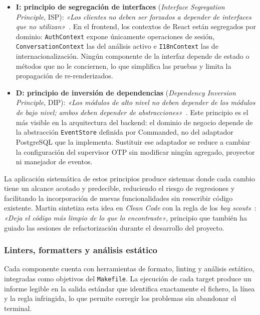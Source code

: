 \begin{itemize}
 \item \textbf{I: principio de segregación de interfaces} (\emph{Interface Segregation Principle}, ISP): \emph{«Los clientes no deben ser forzados a depender de interfaces que no utilizan»}~\cite{MartinPPP02}. En el frontend, los contextos de React están segregados por dominio: \texttt{AuthContext} expone únicamente operaciones de sesión, \texttt{ConversationContext} las del análisis activo e \texttt{I18nContext} las de internacionalización. Ningún componente de la interfaz depende de estado o métodos que no le conciernen, lo que simplifica las pruebas y limita la propagación de re-renderizados.

 \item \textbf{D: principio de inversión de dependencias} (\emph{Dependency Inversion Principle}, DIP): \emph{«Los módulos de alto nivel no deben depender de los módulos de bajo nivel; ambos deben depender de abstracciones»}~\cite{MartinPPP02}. Este principio es el más visible en la arquitectura del backend: el dominio de negocio depende de la abstracción \texttt{EventStore} definida por Commanded, no del adaptador PostgreSQL que la implementa. Sustituir ese adaptador se reduce a cambiar la configuración del supervisor OTP sin modificar ningún agregado, proyector ni manejador de eventos.
\end{itemize}

La aplicación sistemática de estos principios produce sistemas donde cada cambio tiene un alcance acotado y predecible, reduciendo el riesgo de regresiones y facilitando la incorporación de nuevas funcionalidades sin reescribir código existente. Martin sintetiza esta idea en \emph{Clean Code} con la regla de los \emph{boy scouts}~\cite{MartinCleanCode08}: \emph{«Deja el código más limpio de lo que lo encontraste»}, principio que también ha guiado las sesiones de refactorización durante el desarrollo del proyecto.

\subsubsection{Linters, formatters y análisis estático}

Cada componente cuenta con herramientas de formato, linting y análisis estático, integradas como objetivos del \texttt{Makefile}. La ejecución de cada target produce un informe legible en la salida estándar que identifica exactamente el fichero, la línea y la regla infringida, lo que permite corregir los problemas sin abandonar el terminal.

